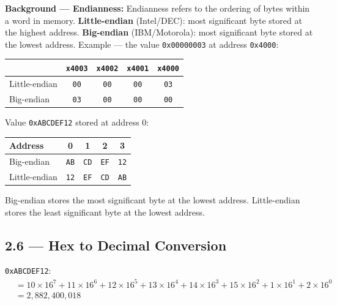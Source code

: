 \begin{flushright}
\begin{minipage}{0.88\linewidth}
\scriptsize
\textbf{Background --- Endianness:}\quad
Endianness refers to the ordering of bytes within a word in memory.
\textbf{Little-endian} (Intel/DEC): most significant byte stored at the
highest address.
\textbf{Big-endian} (IBM/Motorola): most significant byte stored at the
lowest address.
Example --- the value \texttt{0x00000003} at address \texttt{0x4000}:

\begin{center}
\begin{tabular}{lcccc}
\toprule
& \texttt{x4003} & \texttt{x4002} & \texttt{x4001} & \texttt{x4000} \\
\midrule
Little-endian & \texttt{00} & \texttt{00} & \texttt{00} & \texttt{03} \\
Big-endian    & \texttt{03} & \texttt{00} & \texttt{00} & \texttt{00} \\
\bottomrule
\end{tabular}
\end{center}
\end{minipage}
\end{flushright}
\medskip

Value \texttt{0xABCDEF12} stored at address 0:

\begin{center}
\begin{tabular}{lcccc}
\toprule
\textbf{Address} & 0 & 1 & 2 & 3 \\
\midrule
Big-endian    & \texttt{AB} & \texttt{CD} & \texttt{EF} & \texttt{12} \\
Little-endian & \texttt{12} & \texttt{EF} & \texttt{CD} & \texttt{AB} \\
\bottomrule
\end{tabular}
\end{center}

Big-endian stores the most significant byte at the lowest address.
Little-endian stores the least significant byte at the lowest address.

\subsection*{2.6 --- Hex to Decimal Conversion}
\hypertarget{sol-2.6}{}

\texttt{0xABCDEF12}:
\begin{align*}
  &= 10 \times 16^7 + 11 \times 16^6 + 12 \times 16^5 + 13 \times 16^4
     + 14 \times 16^3 + 15 \times 16^2 + 1 \times 16^1 + 2 \times 16^0 \\
  &= 2{,}882{,}400{,}018
\end{align*}

